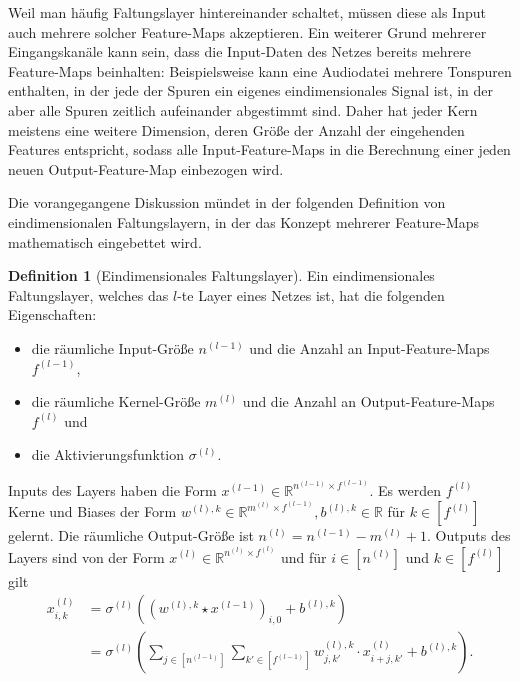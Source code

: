 \documentclass[paper=a4, 	%
		fontsize=11pt, 		%
		abstracton, 	%
		headsepline, 	%
		notitlepage	%
		]{scrartcl}
\theoremstyle{definition}
\newtheorem{definition}[theorem]{Definition}
\newcommand{\R}{\mathbb{R}}
\newcommand{\fNat}[1]{[ #1 ]}
\begin{document}
Weil man häufig Faltungslayer hintereinander schaltet, müssen diese als Input auch mehrere solcher Feature-Maps akzeptieren.
Ein weiterer Grund mehrerer Eingangskanäle kann sein, dass die Input-Daten des Netzes bereits mehrere Feature-Maps beinhalten:
Beispielsweise kann eine Audiodatei mehrere Tonspuren enthalten, in der jede der Spuren ein eigenes eindimensionales Signal ist, in der aber alle Spuren zeitlich aufeinander abgestimmt sind.
Daher hat jeder Kern meistens eine weitere Dimension, deren Größe der Anzahl der eingehenden Features entspricht, sodass alle Input-Feature-Maps in die Berechnung einer jeden neuen Output-Feature-Map einbezogen wird.

Die vorangegangene Diskussion mündet in der folgenden Definition von eindimensionalen Faltungslayern, in der das Konzept mehrerer Feature-Maps mathematisch eingebettet wird.

\begin{definition}[Eindimensionales Faltungslayer]\label{def:one-dimensional-conv-layer}
    Ein eindimensionales Faltungslayer, welches das $l$-te Layer eines Netzes ist, hat die folgenden Eigenschaften:
    \begin{itemize}
        \item die räumliche Input-Größe $n^{(l-1)}$ und die Anzahl an Input-Feature-Maps $f^{(l-1)}$,
        \item die räumliche Kernel-Größe $m^{(l)}$ und die Anzahl an Output-Feature-Maps $f^{(l)}$ und
        \item die Aktivierungsfunktion $\sigma^{(l)}$.
    \end{itemize}
    Inputs des Layers haben die Form $x^{(l-1)}\in\R^{n^{(l-1)} \times f^{(l-1)}}$.
    Es werden $f^{(l)}$ Kerne und Biases der Form $w^{(l),k}\in\R^{m^{(l)} \times f^{(l-1)}}, b^{(l),k}\in\R$ für  $k\in \fNat{f^{(l)}}$ gelernt.
    Die räumliche Output-Größe ist $n^{(l)} = n^{(l-1)}-  m^{(l)} + 1$.
    Outputs des Layers sind von der Form $x^{(l)}\in \R^{n^{(l)}\times f^{(l)}}$ und für $i\in\fNat{n^{(l)}}$ und $k\in\fNat{f^{(l)}}$ gilt
    \begin{align*}
        x^{(l)}_{i,k}
        &=  \sigma^{(l)}\left( (w^{(l),k} \star x^{(l-1)})_{i,0} + b^{(l),k} \right)\\
        &= \sigma^{(l)} \left( 
            \sum_{j \in \fNat{n^{(l-1)}}} \sum_{k'\in \fNat{f^{(l-1)}}}
            w^{(l),k}_{j,k'} \cdot x^{(l)}_{i+j, k'} + b^{(l), k}
        \right).
    \end{align*}
\end{definition}
\end{document}
